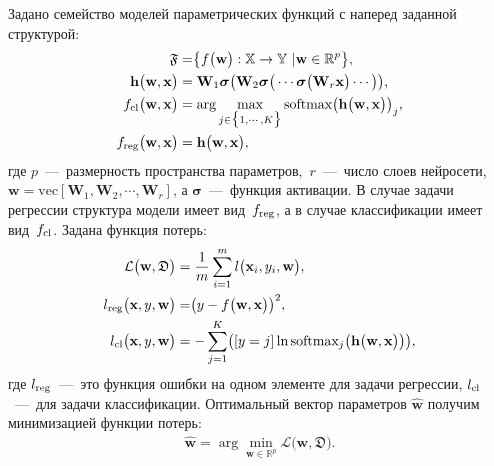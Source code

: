 Задано семейство моделей параметрических функций с наперед заданной структурой:
\begin{equation}
\label{eq:st:2}
\begin{aligned}
\mathfrak{F} &= \bigr\{f\bigr(\textbf{w}\bigr):\mathbb{X} \to \mathbb{Y}~| \textbf{w} \in \mathbb{R}^{p}\bigr\}, \\ 
\mathbf{h}\bigr(\textbf{w}, \textbf{x}\bigr) &= \textbf{W}_1\bm{\sigma}\bigr(\textbf{W}_2\bm{\sigma}\bigr(\cdots\bm{\sigma}\bigr(\textbf{W}_r\textbf{x}\bigr)\cdots\bigr)\bigr),\\
f_{\text{\text{cl}}}\bigr(\textbf{w}, \textbf{x}\bigr) &= \arg \max_{j \in \bigr\{1,\cdots, K\bigr\}} \text{softmax}\bigr(\mathbf{h}\bigr(\textbf{w}, \textbf{x}\bigr)\bigr)_{j}, \\ 
f_{\text{reg}}\bigr(\textbf{w}, \textbf{x}\bigr) & = \mathbf{h}\bigr(\textbf{w}, \textbf{x}\bigr), 
\end{aligned}
\end{equation}
где $p$~---~размерность пространства параметров,~$r$~---~число слоев нейросети,~$\textbf{w} = \text{vec}[\textbf{W}_1, \textbf{W}_2, \cdots, \textbf{W}_r]$, а $\bm{\sigma}$~---~функция активации. В случае задачи регрессии структура модели имеет вид~$f_{\text{\text{reg}}}$, а в случае классификации имеет вид~$f_{\text{\text{cl}}}$.
Задана функция потерь:
\begin{equation}
\label{eq:st:3}
\begin{aligned}
\mathcal{L}\bigr(\textbf{w}, \mathfrak{D}\bigr) &= \frac{1}{m}\sum_{i=1}^{m}l\bigr(\textbf{x}_{i}, y_i, \textbf{w}\bigr),\\
l_{\text{\text{reg}}}\bigr(\textbf{x}, y, \textbf{w}\bigr) &= \bigr(y - f\bigr(\textbf{w}, \textbf{x}\bigr)\bigr)^{2},\\
l_{\text{\text{cl}}}\bigr(\textbf{x}, y, \textbf{w}\bigr) &= -\sum_{j=1}^{K}\bigr([y = j]\ln\text{softmax}_j\bigr(\mathbf{h}\bigr(\textbf{w}, \textbf{x}\bigr)\bigr)\bigr),
\end{aligned}
\end{equation}
где $l_{\text{\text{reg}}}$~---~это функция ошибки на одном элементе для задачи регрессии, $l_{\text{\text{cl}}}$~---~для задачи классификации.
Оптимальный вектор параметров $\hat{\textbf{w}}$ получим минимизацией функции потерь:
\begin{equation}
\label{eq:st:0:1}
\begin{aligned}
\hat{\textbf{w}} = \arg \min_{\textbf{w}\in\mathbb{R}^{p}} \mathcal{L}\bigr(\textbf{w}, \mathfrak{D}\bigr).
\end{aligned}
\end{equation}

